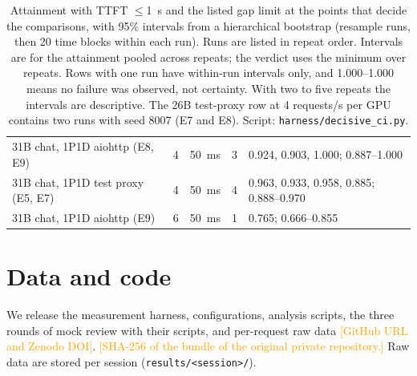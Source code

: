 \documentclass[11pt]{article}
\newcommand{\todo}[1]{\textcolor{orange}{[#1]}}
\begin{document}
\begin{table}[H]
\begin{tabularx}{\linewidth}{Lllll}
31B chat, 1P1D aiohttp (E8, E9) & 4 & 50~ms & 3 & 0.924, 0.903, 1.000; 0.887--1.000 \\
31B chat, 1P1D test proxy (E5, E7) & 4 & 50~ms & 4 & 0.963, 0.933, 0.958, 0.885; 0.888--0.970 \\
31B chat, 1P1D aiohttp (E9) & 6 & 50~ms & 1 & 0.765; 0.666--0.855 \\
\bottomrule
\end{tabularx}
\caption{Attainment with TTFT $\le$1~s and the listed gap limit at the points that decide the comparisons, with 95\% intervals from a hierarchical bootstrap (resample runs, then 20 time blocks within each run). Runs are listed in repeat order. Intervals are for the attainment pooled across repeats; the verdict uses the minimum over repeats. Rows with one run have within-run intervals only, and 1.000--1.000 means no failure was observed, not certainty. With two to five repeats the intervals are descriptive. The 26B test-proxy row at 4 requests/s per GPU contains two runs with seed 8007 (E7 and E8). Script: \texttt{harness/decisive\_ci.py}.}
\label{tab:ci}
\end{table}

\section{Data and code}\label{app:data}
We release the measurement harness, configurations, analysis scripts, the three rounds of mock review with their scripts, and per-request raw data \todo{GitHub URL and Zenodo DOI}. \todo{SHA-256 of the bundle of the original private repository.} Raw data are stored per session (\texttt{results/\textless session\textgreater/}).
\end{document}
